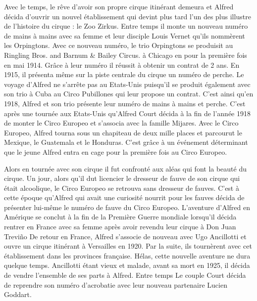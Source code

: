 Avec le temps, le rêve d’avoir son propre cirque itinérant demeura et Alfred décida d’ouvrir un nouvel établissement qui devint plus tard l’un des plus illustre de l’histoire du cirque : le Zoo Zirkus. Entre temps il monte un nouveau numéro de mains à mains avec sa femme et leur disciple Louis Vernet qu’ils nommèrent les Orpingtons. Avec ce nouveau numéro, le trio Orpingtons se produisit au Ringling Bros. and Barnum \& Bailey Circus. à Chicago en pour la première fois en mai 1914. Grâce à leur numéro il réussit à obtenir un contrat de 2 ans. En 1915, il présenta même sur la piste centrale du cirque un numéro de perche. Le voyage d’Alfred ne s’arrête pas au Etats-Unis puisqu’il se produit également avec son trio à Cuba au Circo Pubillones qui leur propose un contrat. C’est ainsi qu’en 1918, Alfred et son trio présente leur numéro de mains à mains et perche. 
C’est après une tournée aux Etats-Unis qu’Alfred Court décida à la fin de l’année 1918 de monter le Circo Europeo et s’associa avec la famille Mijares. Avec le Circo Europeo, Alfred tourna sous un chapiteau de deux mille places et parcourut le Mexique, le Guatemala et le Honduras. C’est grâce à un événement déterminant que le jeune Alfred entra en cage pour la première fois au Circo Europeo. 

Alors en tournée avec son cirque il fut confronté aux aléas qui font la beauté du cirque. Un jour, alors qu’il dut licencier le dresseur de fauve de son cirque qui était alcoolique, le Circo Europeo se retrouva sans dresseur de fauves. C’est à cette époque qu’Alfred qui avait une curiosité nourrit pour les fauves décida de présenter lui-même le numéro de fauve du Circo Europeo. L’aventure d’Alfred en Amérique se conclut à la fin de la Première Guerre mondiale lorsqu’il décida rentrer en France avec sa femme après avoir revendu leur cirque à Don Juan Treviño
De retour en France, Alfred s’associe de nouveau avec Ugo Ancillotti et ouvre un cirque itinérant à Versailles en 1920. Par la suite, ils tournèrent avec cet établissement dans les provinces française. Hélas, cette nouvelle aventure ne dura quelque temps. Ancillotti étant vieux et malade, avant sa mort en 1925, il décida de vendre l’ensemble de ses parts à Alfred. Entre temps Le couple Court décida de reprendre son numéro d’acrobatie avec leur nouveau partenaire Lucien Goddart.

